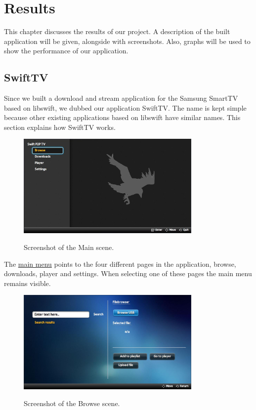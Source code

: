 \chapter{Results}
This chapter discusses the results of our project. A description of the built application will be given, alongside with screenshots.
Also, graphs will be used to show the performance of our application.

\section{SwiftTV}
Since we built a download and stream application for the Samsung SmartTV based on libswift, we dubbed our application SwiftTV.
The name is kept simple because other existing applications based on libswift have similar names. This section explains how SwiftTV works.

\begin{center}
\begin{figure}[h!]
	\centering
	\mbox{\includegraphics[width=0.8\textwidth]{Images/MainScene.jpg}}
	\label{fig:main}
	\caption{Screenshot of the Main scene.}
\end{figure}
\end{center}

The \hyperref[fig:main]{main menu} points to the four different pages in the application, browse, downloads, player and settings. When selecting one of these pages the main menu remains visible.

\begin{center}
\begin{figure}[h]
	\centering
	\mbox{\includegraphics[width=0.8\textwidth]{Images/BrowseScene.jpg}}
	\label{fig:browse}
	\caption{Screenshot of the Browse scene.}
\end{figure}
\end{center}

